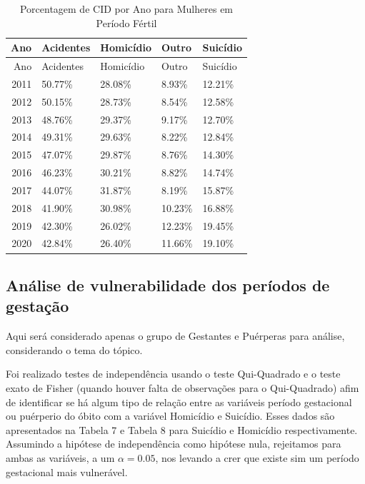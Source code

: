 \documentclass[
]{article}
\begin{document}
\begin{longtable}[]{@{}rllll@{}}
\caption{Porcentagem de CID por Ano para Mulheres em Período
Fértil}\tabularnewline
\toprule()
Ano & Acidentes & Homicídio & Outro & Suicídio \\
\midrule()
\endfirsthead
\toprule()
Ano & Acidentes & Homicídio & Outro & Suicídio \\
\midrule()
\endhead
2011 & 50.77\% & 28.08\% & 8.93\% & 12.21\% \\
2012 & 50.15\% & 28.73\% & 8.54\% & 12.58\% \\
2013 & 48.76\% & 29.37\% & 9.17\% & 12.70\% \\
2014 & 49.31\% & 29.63\% & 8.22\% & 12.84\% \\
2015 & 47.07\% & 29.87\% & 8.76\% & 14.30\% \\
2016 & 46.23\% & 30.21\% & 8.82\% & 14.74\% \\
2017 & 44.07\% & 31.87\% & 8.19\% & 15.87\% \\
2018 & 41.90\% & 30.98\% & 10.23\% & 16.88\% \\
2019 & 42.30\% & 26.02\% & 12.23\% & 19.45\% \\
2020 & 42.84\% & 26.40\% & 11.66\% & 19.10\% \\
\bottomrule()
\end{longtable}

\hypertarget{anuxe1lise-de-vulnerabilidade-dos-peruxedodos-de-gestauxe7uxe3o}{%
\subsection{Análise de vulnerabilidade dos períodos de
gestação}\label{anuxe1lise-de-vulnerabilidade-dos-peruxedodos-de-gestauxe7uxe3o}}

Aqui será considerado apenas o grupo de Gestantes e Puérperas para
análise, considerando o tema do tópico.

Foi realizado testes de independência usando o teste Qui-Quadrado e o
teste exato de Fisher (quando houver falta de observações para o
Qui-Quadrado) afim de identificar se há algum tipo de relação entre as
variáveis período gestacional ou puérperio do óbito com a variável
Homicídio e Suicídio. Esses dados são apresentados na Tabela 7 e Tabela
8 para Suicídio e Homicídio respectivamente. Assumindo a hipótese de
independência como hipótese nula, rejeitamos para ambas as variáveis, a
um \(\alpha = 0.05\), nos levando a crer que existe sim um período
gestacional mais vulnerável.
\end{document}
